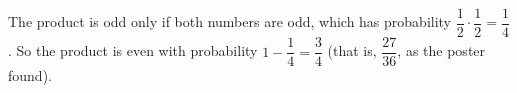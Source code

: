 The product is odd only if both numbers are odd, which has probability $\dfrac{1}{2}\cdot\dfrac{1}{2}=\dfrac{1}{4}$. So the product is even with probability $1-\dfrac{1}{4}=\boxed{\dfrac{3}{4}}$ (that is, $\dfrac{27}{36}$, as the poster found).

